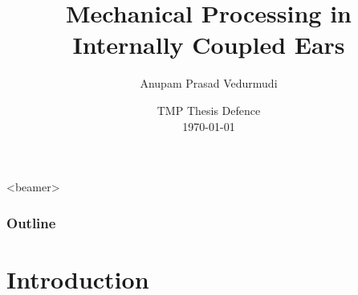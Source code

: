 \documentclass{beamer}
\title{\LARGE Mechanical Processing in Internally Coupled Ears}
\author{\Large Anupam Prasad Vedurmudi}
\date{TMP Thesis Defence\\ \today}
\begin{document}
\begin{frame}[t]
 \titlepage
 

\end{frame}

  \begin{frame}<beamer>
    \frametitle{Outline}
    \begin{multicols}{2}
    \tableofcontents
    \end{multicols}
  \end{frame}

\section{Introduction}
\end{document}
